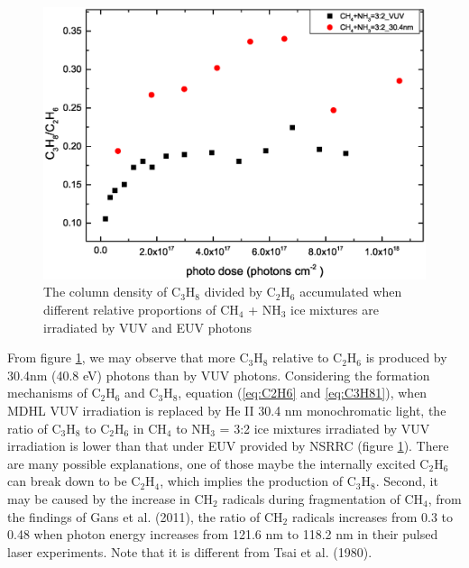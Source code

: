 \begin{figure}
\centering
\includegraphics[width=\textwidth]{figures/chapter3/NSRRC_Lab_C3H8_C2H6.eps}
\caption{The column density of C$_3$H$_8$ divided by C$_2$H$_6$ accumulated when different relative proportions of CH$_4$ + NH$_3$ ice mixtures are irradiated by VUV and EUV photons}
\label{fig:NSRRC_Lab_C3H8_C2H6}
\end{figure}


From figure \ref{fig:NSRRC_Lab_C3H8_C2H6}, we may observe that more C$_3$H$_8$ relative to C$_2$H$_6$ is produced by 30.4nm (40.8 eV) photons than by VUV photons. Considering the formation mechanisms of C$_2$H$_6$ and C$_3$H$_8$, equation (\ref{eq:C2H6} and \ref{eq:C3H81}), when MDHL VUV irradiation is replaced by He II 30.4 nm monochromatic light, the ratio of C$_3$H$_8$ to C$_2$H$_6$ in CH$_4$ to NH$_3$ = 3:2 ice mixtures irradiated by VUV irradiation is lower than that under EUV provided by NSRRC (figure \ref{fig:NSRRC_Lab_C3H8_C2H6}). There are many possible explanations, one of those maybe the internally excited C$_2$H$_6$ can break down to be C$_2$H$_4$, which implies the production of C$_3$H$_8$. Second, it may be caused by the increase in CH$_2$ radicals during fragmentation of CH$_4$, from the findings of Gans et al. (2011)\cite{gans2011photolysis}, the ratio of CH$_2$ radicals increases from 0.3 to 0.48 when photon energy increases from 121.6 nm to 118.2 nm in their pulsed laser experiments. Note that it is different from Tsai et al. (1980)\cite{tsai1980mass}.\\


